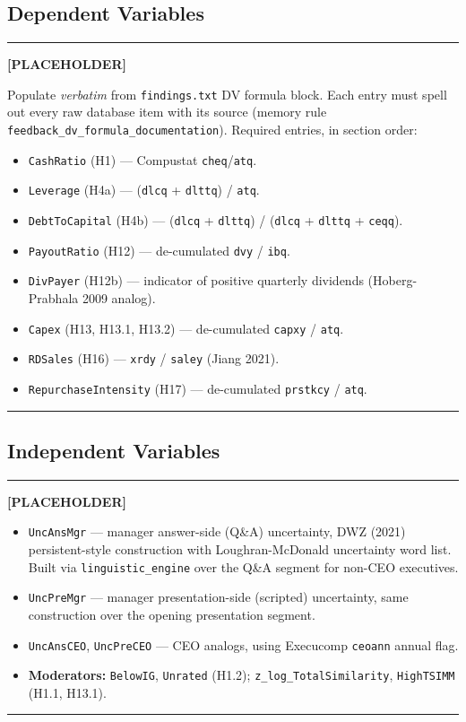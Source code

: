 \documentclass[11pt,a4paper,twocolumn]{article}
\newenvironment{placeholder}{%
  \par\medskip\noindent%
  {\color{placeholderaccent}\rule{\linewidth}{0.4pt}}\par%
  \noindent\textbf{\color{placeholderaccent}[PLACEHOLDER]}\par%
  \smallskip\itshape%
}{%
  \par\upshape\smallskip%
  {\color{placeholderaccent}\rule{\linewidth}{0.4pt}}\par\medskip%
}
\begin{document}
\subsection{Dependent Variables}
\label{app:vardef_dv}
\begin{placeholder}
Populate \emph{verbatim} from \texttt{findings.txt} DV formula block.
Each entry must spell out every raw database item with its source
(memory rule \texttt{feedback\_dv\_formula\_documentation}). Required
entries, in section order:
\begin{itemize}
  \item \texttt{CashRatio} (H1) --- Compustat \texttt{cheq}/\texttt{atq}.
  \item \texttt{Leverage} (H4a) --- (\texttt{dlcq} + \texttt{dlttq}) /
        \texttt{atq}.
  \item \texttt{DebtToCapital} (H4b) --- (\texttt{dlcq} +
        \texttt{dlttq}) / (\texttt{dlcq} + \texttt{dlttq} +
        \texttt{ceqq}).
  \item \texttt{PayoutRatio} (H12) --- de-cumulated
        \texttt{dvy} / \texttt{ibq}.
  \item \texttt{DivPayer} (H12b) --- indicator of positive quarterly
        dividends (Hoberg-Prabhala 2009 analog).
  \item \texttt{Capex} (H13, H13.1, H13.2) --- de-cumulated
        \texttt{capxy} / \texttt{atq}.
  \item \texttt{RDSales} (H16) --- \texttt{xrdy} / \texttt{saley}
        (Jiang 2021).
  \item \texttt{RepurchaseIntensity} (H17) --- de-cumulated
        \texttt{prstkcy} / \texttt{atq}.
\end{itemize}
\end{placeholder}

\subsection{Independent Variables}
\label{app:vardef_iv}
\begin{placeholder}
\begin{itemize}
  \item \texttt{UncAnsMgr} --- manager answer-side (Q\&A) uncertainty,
        DWZ (2021) persistent-style construction with Loughran-McDonald
        uncertainty word list. Built via \texttt{linguistic\_engine}
        over the Q\&A segment for non-CEO executives.
  \item \texttt{UncPreMgr} --- manager presentation-side (scripted)
        uncertainty, same construction over the opening presentation
        segment.
  \item \texttt{UncAnsCEO}, \texttt{UncPreCEO} --- CEO analogs, using
        Execucomp \texttt{ceoann} annual flag.
  \item \textbf{Moderators:}
        \texttt{BelowIG}, \texttt{Unrated} (H1.2);
        \texttt{z\_log\_TotalSimilarity}, \texttt{HighTSIMM}
        (H1.1, H13.1).
\end{itemize}
\end{placeholder}
\end{document}
